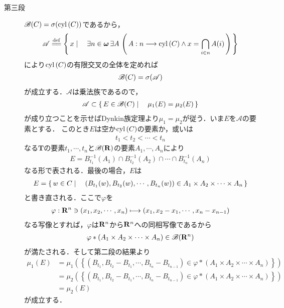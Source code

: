 \begin{prf}
\begin{description}
			\item[第三段]
				$\mathscr{B}(C) = \sigma(\operatorname{cyl}\left(C\right))$であるから，
				\begin{align}
					\mathscr{A} \defeq \Set{x}{\exists n \in \Natural\, \exists A\, 
					\left(\, A:n \longrightarrow \cyl{C} \wedge x = \bigcap_{i \in n}A(i)\, \right)}
				\end{align}
				により$\operatorname{cyl}\left(C\right)$の有限交叉の全体を定めれば
				\begin{align}
					\mathscr{B}(C) = \sigma(\mathscr{A})
				\end{align}
				が成立する．$\mathscr{A}$は乗法族であるので，
				\begin{align}
					\mathscr{A} \subset \left\{\, E \in \mathscr{B}(C) \mid \quad \mu_1(E) = \mu_2(E)\, \right\}
				\end{align}
				が成り立つことを示せばDynkin族定理より$\mu_1 = \mu_2$が従う．いま$E$を$\mathscr{A}$の要素とする．
				このとき$E$は空か$\operatorname{cyl}\left(C\right)$の要素か，或いは
				\begin{align}
					t_1 < t_2 < \cdots < t_n
				\end{align}
				なる$\mathbf{T}$の要素$t_1,\cdots,t_n$と$\mathscr{B}(\mathbf{R})$の要素$A_1,\cdots,A_n$により
				\begin{align}
					E = B_{t_1}^{-1}(A_1) \cap B_{t_2}^{-1}(A_2) \cap \cdots \cap B_{t_n}^{-1}(A_n)
				\end{align}
				なる形で表される．最後の場合，$E$は
				\begin{align}
					E = \left\{\, w \in C \mid \quad \left(B_{t_1}(w),B_{t_2}(w),\cdots,B_{t_n}(w)\right) \in A_1 \times A_2 \times \cdots \times A_n\, \right\}
				\end{align}
				と書き直される．ここで$\varphi$を
				\begin{align}
					\varphi:\mathbf{R}^n \ni (x_1,x_2,\cdots,x_n) \longmapsto (x_1,x_2-x_1,\cdots,x_n - x_{n-1})
				\end{align}
				なる写像とすれば，$\varphi$は$\mathbf{R}^n$から$\mathbf{R}^n$への同相写像であるから
				\begin{align}
					\varphi \ast \left(A_1 \times A_2 \times \cdots \times A_n\right) \in \mathscr{B}(\mathbf{R}^n)
				\end{align}
				が満たされる．そして第二段の結果より
				\begin{align}
					\mu_1(E) &= \mu_1\left(\left\{\left(B_{t_1},B_{t_2}-B_{t_1},\cdots,B_{t_n}-B_{t_{n-1}}\right)
					\in \varphi \ast \left(A_1 \times A_2 \times \cdots \times A_n\right)\right\}\right) \\
					&= \mu_2\left(\left\{\left(B_{t_1},B_{t_2}-B_{t_1},\cdots,B_{t_n}-B_{t_{n-1}}\right)
					\in \varphi \ast \left(A_1 \times A_2 \times \cdots \times A_n\right)\right\}\right) \\
					&= \mu_2(E)
				\end{align}
				が成立する．
				\QED
		\end{description}
	\end{prf}
	
